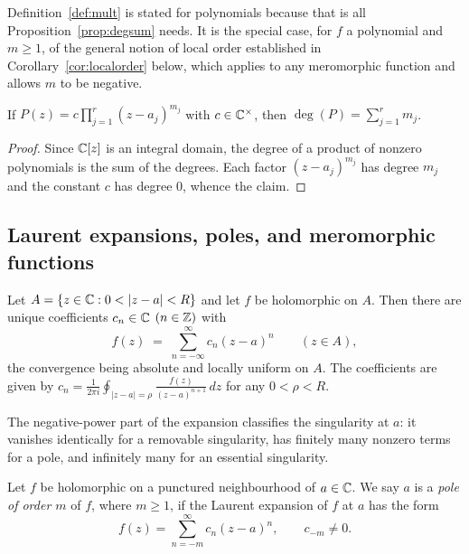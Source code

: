 \begin{remark}
Definition~\ref{def:mult} is stated for polynomials because that is all
Proposition~\ref{prop:degsum} needs. It is the special case, for $f$ a
polynomial and $m \geq 1$, of the general notion of local order established in
Corollary~\ref{cor:localorder} below, which applies to any meromorphic function
and allows $m$ to be negative.
\end{remark}

\begin{smjproposition}\label{prop:degsum}
If $P(z) = c \prod_{j=1}^{r} (z-a_j)^{m_j}$ with $c \in \mathbb{C}^\times$, then
$\deg(P) = \sum_{j=1}^{r} m_j$.
\end{smjproposition}

\begin{proof}
Since $\mathbb{C}[z]$ is an integral domain, the degree of a product of nonzero
polynomials is the sum of the degrees. Each factor $(z-a_j)^{m_j}$ has degree
$m_j$ and the constant $c$ has degree $0$, whence the claim.
\end{proof}

\subsection{Laurent expansions, poles, and meromorphic functions}

\begin{theorem}\label{thm:laurent}
Let $A = \{z \in \mathbb{C} : 0 < |z-a| < R\}$ and let $f$ be holomorphic on $A$. Then
there are unique coefficients $c_n \in \mathbb{C}$ $(n \in \mathbb{Z})$ with
\[
f(z) \;=\; \sum_{n=-\infty}^{\infty} c_n (z-a)^n \qquad (z \in A),
\]
the convergence being absolute and locally uniform on $A$. The coefficients are
given by $c_n = \frac{1}{2\pi i}\oint_{|z-a|=\rho} \frac{f(z)}{(z-a)^{n+1}}\,dz$
for any $0 < \rho < R$.
\end{theorem}

The negative-power part of the expansion classifies the singularity at $a$: it
vanishes identically for a removable singularity, has finitely many nonzero terms
for a pole, and infinitely many for an essential singularity.

\begin{definition}\label{def:pole}
Let $f$ be holomorphic on a punctured neighbourhood of $a \in \mathbb{C}$. We say $a$ is
a \emph{pole of order $m$} of $f$, where $m \geq 1$, if the Laurent expansion of
$f$ at $a$ has the form
\[
f(z) = \sum_{n=-m}^{\infty} c_n (z-a)^n, \qquad c_{-m} \neq 0 .
\]
\end{definition}

